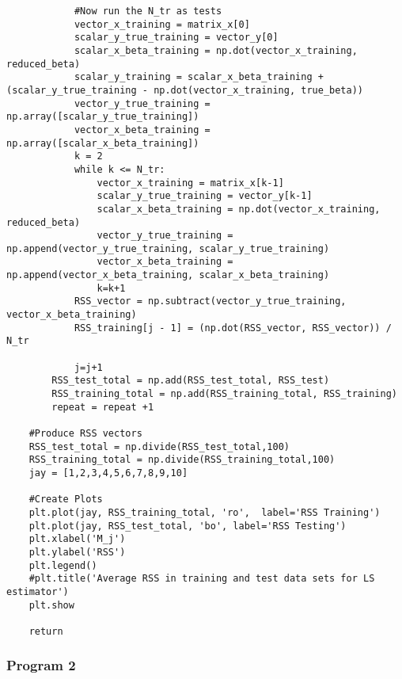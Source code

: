 \documentclass{article}
\begin{document}
\begin{lstlisting}
            #Now run the N_tr as tests
            vector_x_training = matrix_x[0]
            scalar_y_true_training = vector_y[0]
            scalar_x_beta_training = np.dot(vector_x_training, reduced_beta)
            scalar_y_training = scalar_x_beta_training + (scalar_y_true_training - np.dot(vector_x_training, true_beta))
            vector_y_true_training = np.array([scalar_y_true_training])
            vector_x_beta_training = np.array([scalar_x_beta_training])
            k = 2
            while k <= N_tr:
                vector_x_training = matrix_x[k-1]
                scalar_y_true_training = vector_y[k-1]
                scalar_x_beta_training = np.dot(vector_x_training, reduced_beta)
                vector_y_true_training = np.append(vector_y_true_training, scalar_y_true_training)
                vector_x_beta_training = np.append(vector_x_beta_training, scalar_x_beta_training)
                k=k+1
            RSS_vector = np.subtract(vector_y_true_training, vector_x_beta_training)
            RSS_training[j - 1] = (np.dot(RSS_vector, RSS_vector)) / N_tr

            j=j+1
        RSS_test_total = np.add(RSS_test_total, RSS_test)
        RSS_training_total = np.add(RSS_training_total, RSS_training)
        repeat = repeat +1

    #Produce RSS vectors
    RSS_test_total = np.divide(RSS_test_total,100)
    RSS_training_total = np.divide(RSS_training_total,100)
    jay = [1,2,3,4,5,6,7,8,9,10]

    #Create Plots
    plt.plot(jay, RSS_training_total, 'ro',  label='RSS Training')
    plt.plot(jay, RSS_test_total, 'bo', label='RSS Testing')
    plt.xlabel('M_j')
    plt.ylabel('RSS')
    plt.legend()
    #plt.title('Average RSS in training and test data sets for LS estimator')
    plt.show

    return
\end{lstlisting}

\vspace{-0.5cm}
\subsubsection{Program 2}
\vspace{-0.5cm}
\label{subsec:Program 2} 
\end{document}
